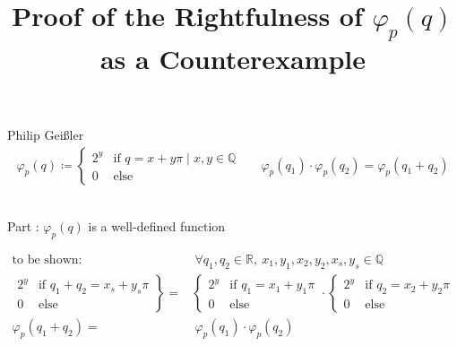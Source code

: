 \documentclass[12pt, a4paper]{article}
\newcommand{\rom}[1]{\uppercase\expandafter{\romannumeral #1\relax}}
\begin{document}
\title{Proof of the Rightfulness of $\varphi_p(q)$ as a Counterexample}
\author{}
\date{}
\maketitle
\vspace*{-1.9cm}
\centering
Philip Gei\ss{}ler\\
\begin{align*}
\varphi_p(q) \coloneqq \left\{\begin{array}{rl}2^{y} & \text{if } q = x + y\pi \mid x,y\in\mathbb{Q}\\ 0& \text{else}\end{array}\right. & & \varphi_p(q_1)\cdot\varphi_p(q_2) = \varphi_p(q_1+q_2)
\end{align*}\\\vspace*{7mm}
\begin{Large}Part \rom{1}: $\varphi_p(q)$ is a well-defined function\end{Large}
\begin{align*}
\text{to be shown:~~~~}&~\forall q_1,q_2\in \mathbb{R},~ x_1,y_1,x_2,y_2,x_s,y_s\in\mathbb{Q}\\
\left.\begin{array}{rl}2^{y} & \text{if } q_1+q_2 = x_s + y_s\pi\\ 0& \text{else}\end{array}\right\} =& \left\{\begin{array}{rl}2^{y} & \text{if } q_1 = x_1 + y_1\pi \\ 0& \text{else}\end{array}\right.\cdot\left\{\begin{array}{rl}2^{y} & \text{if } q_2 = x_2 + y_2\pi \\ 0& \text{else}\end{array}\right.\\
\varphi_p(q_1 + q_2)  =& ~\varphi_p(q_1) \cdot \varphi_p(q_2)\\
\end{align*}\vspace*{-15mm}
\end{document}
